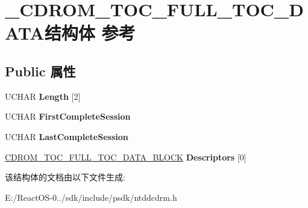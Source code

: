 \hypertarget{struct___c_d_r_o_m___t_o_c___f_u_l_l___t_o_c___d_a_t_a}{}\section{\+\_\+\+C\+D\+R\+O\+M\+\_\+\+T\+O\+C\+\_\+\+F\+U\+L\+L\+\_\+\+T\+O\+C\+\_\+\+D\+A\+T\+A结构体 参考}
\label{struct___c_d_r_o_m___t_o_c___f_u_l_l___t_o_c___d_a_t_a}
\subsection*{Public 属性}
\begin{DoxyCompactItemize}
\item 
\mbox{\label{struct___c_d_r_o_m___t_o_c___f_u_l_l___t_o_c___d_a_t_a_a5653e556065caf95d8a6ea1314487480}} 
U\+C\+H\+AR {\bfseries Length} \mbox{[}2\mbox{]}
\item 
\mbox{\label{struct___c_d_r_o_m___t_o_c___f_u_l_l___t_o_c___d_a_t_a_a30a965a9ec2bf75a79436d2e0d8aaa3a}} 
U\+C\+H\+AR {\bfseries First\+Complete\+Session}
\item 
\mbox{\label{struct___c_d_r_o_m___t_o_c___f_u_l_l___t_o_c___d_a_t_a_a26700cad8edf823c4cea03ac9c893f44}} 
U\+C\+H\+AR {\bfseries Last\+Complete\+Session}
\item 
\mbox{\label{struct___c_d_r_o_m___t_o_c___f_u_l_l___t_o_c___d_a_t_a_af888130f2a9018edeec8448c79872242}} 
\hyperlink{struct___c_d_r_o_m___t_o_c___f_u_l_l___t_o_c___d_a_t_a___b_l_o_c_k}{C\+D\+R\+O\+M\+\_\+\+T\+O\+C\+\_\+\+F\+U\+L\+L\+\_\+\+T\+O\+C\+\_\+\+D\+A\+T\+A\+\_\+\+B\+L\+O\+CK} {\bfseries Descriptors} \mbox{[}0\mbox{]}
\end{DoxyCompactItemize}


该结构体的文档由以下文件生成\+:\begin{DoxyCompactItemize}
\item 
E\+:/\+React\+O\+S-\/0../sdk/include/psdk/ntddcdrm.\+h\end{DoxyCompactItemize}
